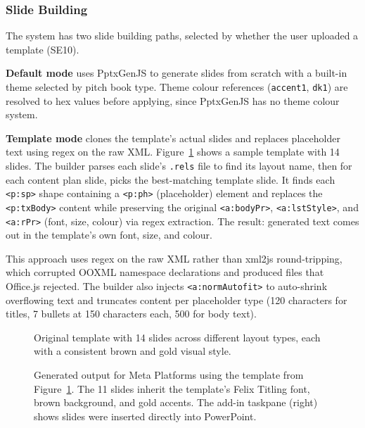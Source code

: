 \subsubsection{Slide Building}

The system has two slide building paths, selected by whether the user uploaded a template (SE10).

\textbf{Default mode} uses PptxGenJS to generate slides from scratch with a built-in theme selected by pitch book type. Theme colour references (\texttt{accent1}, \texttt{dk1}) are resolved to hex values before applying, since PptxGenJS has no theme colour system.

\textbf{Template mode} clones the template's actual slides and replaces placeholder text using regex on the raw XML. Figure~\ref{fig:template-original} shows a sample template with 14 slides. The builder parses each slide's \texttt{.rels} file to find its layout name, then for each content plan slide, picks the best-matching template slide. It finds each \texttt{<p:sp>} shape containing a \texttt{<p:ph>} (placeholder) element and replaces the \texttt{<p:txBody>} content while preserving the original \texttt{<a:bodyPr>}, \texttt{<a:lstStyle>}, and \texttt{<a:rPr>} (font, size, colour) via regex extraction. The result: generated text comes out in the template's own font, size, and colour.

This approach uses regex on the raw XML rather than xml2js round-tripping, which corrupted OOXML namespace declarations and produced files that Office.js rejected. The builder also injects \texttt{<a:normAutofit>} to auto-shrink overflowing text and truncates content per placeholder type (120 characters for titles, 7 bullets at 150 characters each, 500 for body text).

\begin{figure}[H]
  \centering
  \caption{Original template with 14 slides across different layout types, each with a consistent brown and gold visual style.}
  \label{fig:template-original}
\end{figure}

\begin{figure}[H]
  \centering
  \caption{Generated output for Meta Platforms using the template from Figure~\ref{fig:template-original}. The 11 slides inherit the template's Felix Titling font, brown background, and gold accents. The add-in taskpane (right) shows slides were inserted directly into PowerPoint.}
  \label{fig:template-result}
\end{figure}

